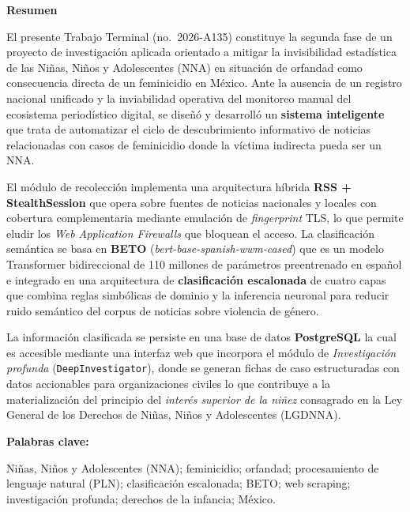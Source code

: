 
\clearpage
\thispagestyle{empty}

\begin{center}
    {\Large\bfseries\color{titleColor} Resumen}
\end{center}

\vspace{0.8cm}

\noindent
El presente Trabajo Terminal (no.\ 2026-A135) constituye la segunda fase de un proyecto de
investigación aplicada orientado a mitigar la invisibilidad estadística de las Niñas, Niños y
Adolescentes (NNA) en situación de orfandad como consecuencia directa de un feminicidio en México.
Ante la ausencia de un registro nacional unificado y la inviabilidad operativa del monitoreo
manual del ecosistema periodístico digital, se diseñó y desarrolló un \textbf{sistema inteligente}
que trata de automatizar el ciclo de descubrimiento informativo de noticias relacionadas con
casos de feminicidio donde la víctima indirecta pueda ser un NNA.
\vspace{0.5cm}

\noindent
El módulo de recolección implementa una arquitectura híbrida \textbf{RSS + StealthSession} que
opera sobre fuentes de noticias nacionales y locales con cobertura complementaria mediante
emulación de \textit{fingerprint} TLS, lo que permite eludir los \textit{Web Application Firewalls}
que bloquean el acceso. La clasificación semántica se basa en \textbf{BETO}
(\textit{bert-base-spanish-wwm-cased}) que es un modelo Transformer bidireccional de 110 millones
de parámetros preentrenado en español e integrado en una arquitectura de \textbf{clasificación
escalonada} de cuatro capas que combina reglas simbólicas de dominio y la inferencia neuronal
para reducir ruido semántico del corpus de noticias sobre violencia de género.

\vspace{0.5cm}

\noindent
La información clasificada se persiste en una base de datos \textbf{PostgreSQL} la cual es
accesible mediante una interfaz web que incorpora el módulo de \textit{Investigación profunda}
(\texttt{DeepInvestigator}), donde se generan fichas de caso estructuradas con datos accionables
para organizaciones civiles lo que contribuye a la materialización del principio del \textit{interés
superior de la niñez} consagrado en la Ley General de los Derechos de Niñas,
Niños y Adolescentes (LGDNNA).

\vspace{1.2cm}

\noindent
{\bfseries\color{sectionColor} Palabras clave:}

\vspace{0.4cm}

\noindent
Niñas, Niños y Adolescentes (NNA);
feminicidio;
orfandad;
procesamiento de lenguaje natural (PLN);
clasificación escalonada;
BETO;
web scraping;
investigación profunda;
derechos de la infancia;
México.

\clearpage

